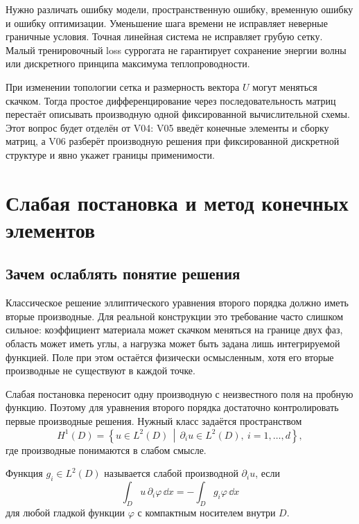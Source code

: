 Нужно различать ошибку модели, пространственную ошибку, временную ошибку и ошибку оптимизации. Уменьшение шага времени не исправляет неверные граничные условия. Точная линейная система не исправляет грубую сетку. Малый тренировочный loss суррогата не гарантирует сохранение энергии волны или дискретного принципа максимума теплопроводности.

При изменении топологии сетка и размерность вектора $U$ могут меняться скачком. Тогда простое дифференцирование через последовательность матриц перестаёт описывать производную одной фиксированной вычислительной схемы. Этот вопрос будет отделён от V04: V05 введёт конечные элементы и сборку матриц, а V06 разберёт производную решения при фиксированной дискретной структуре и явно укажет границы применимости.

\section{Слабая постановка и метод конечных элементов}
\label{sec:pde-weak-form-and-fem}

\subsection{Зачем ослаблять понятие решения}

Классическое решение эллиптического уравнения второго порядка должно иметь вторые производные. Для реальной конструкции это требование часто слишком сильное: коэффициент материала может скачком меняться на границе двух фаз, область может иметь углы, а нагрузка может быть задана лишь интегрируемой функцией. Поле при этом остаётся физически осмысленным, хотя его вторые производные не существуют в каждой точке.

Слабая постановка переносит одну производную с неизвестного поля на пробную функцию. Поэтому для уравнения второго порядка достаточно контролировать первые производные решения. Нужный класс задаётся пространством
\begin{equation}
\label{eq:sobolev-h1-v05}
 H^1(D)
 =
 \left\{
 u\in L^2(D)
 \,\middle|\,
 \partial_i u\in L^2(D),\ i=1,\ldots,d
 \right\},
\end{equation}
где производные понимаются в слабом смысле.

\begin{definition}
Функция $g_i\in L^2(D)$ называется слабой производной $\partial_i u$, если
\begin{equation}
\label{eq:weak-derivative-v05}
 \int_D u\,\partial_i\varphi\,\dd x
 =
 -\int_D g_i\varphi\,\dd x
\end{equation}
для любой гладкой функции $\varphi$ с компактным носителем внутри $D$.
\end{definition}


